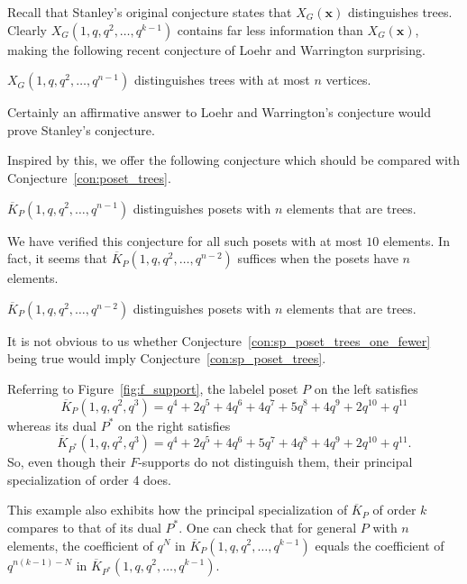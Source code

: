 \documentclass[ALCO,Unicode,published]{cedram}
\newcommand{\x}{\mathbf{x}}
\newcommand{\KK}[1]{\overline{K}_{#1}}
\begin{document}
Recall that Stanley's original conjecture states that $X_G(\x)$ distinguishes trees.  Clearly $X_G(1,q, q^2, \ldots, q^{k-1})$ contains far less information than $X_G(\x)$, making the following recent conjecture of Loehr and Warrington surprising.

\begin{conjecture}
$X_G(1,q, q^2, \ldots, q^{n-1})$ distinguishes trees with at most $n$ vertices.  
\end{conjecture}

Certainly an affirmative answer to Loehr and Warrington's conjecture would prove Stanley's conjecture.

Inspired by this, we offer the following conjecture which should be compared with Conjecture~\ref{con:poset_trees}.

\begin{conjecture}\label{con:sp_poset_trees}
$\KK{P}(1, q, q^2, \ldots, q^{n-1})$ distinguishes posets with $n$ elements that are trees. 
\end{conjecture}

We have verified this conjecture for all such posets with at most $10$ elements.
In fact, it seems that $\KK{P}(1, q, q^2, \ldots, q^{n-2})$ suffices when the posets have $n$ elements. 

\begin{conjecture}\label{con:sp_poset_trees_one_fewer}
$\KK{P}(1, q, q^2, \ldots, q^{n-2})$ distinguishes posets with $n$ elements that are trees. 
\end{conjecture}

It is not obvious to us whether Conjecture~\ref{con:sp_poset_trees_one_fewer} being true would imply Conjecture~\ref{con:sp_poset_trees}.

\begin{example}
Referring to Figure~\ref{fig:f_support}, the labelel poset $P$ on the left satisfies
\[
\KK{P}(1, q, q^2, q^3) = q^4 + 2q^5 + 4q^6 + 4q^7 + 5q^8 + 4q^9 + 2q^{10} + q^{11}
\]
whereas its dual $P^*$ on the right satisfies
\[
\KK{P^*}(1, q, q^2, q^3) = q^4 + 2q^5 + 4q^6 + 5q^7 + 4q^8 + 4q^9 + 2q^{10} + q^{11}.
\]
So, even though their $F$-supports do not distinguish them, their principal specialization of order 4 does.  

This example also exhibits how the principal specialization of $\KK{P}$ of order $k$ compares to that of its dual $P^*$.  One can check that for general $P$ with $n$ elements, the coefficient of $q^N$ in $\KK{P}(1, q, q^2, \ldots, q^{k-1})$ equals the coefficient of $q^{n(k-1)-N}$ in $\KK{P^*}(1, q, q^2, \ldots, q^{k-1})$.  
\end{example}
\end{document}
